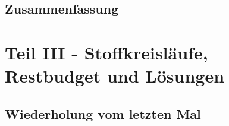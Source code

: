 	\subsection{Zusammenfassung}
	
	\section{Teil III - Stoffkreisläufe, Restbudget und Lösungen}
	\subsection{Wiederholung vom letzten Mal}
	
	
	
	
	
	
	


